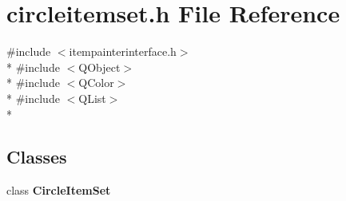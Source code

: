 \section{circleitemset.\+h File Reference}
\label{bk3_2curve_2painters_2circleitemset_8h}
{\ttfamily \#include $<$itempainterinterface.\+h$>$}\\*
{\ttfamily \#include $<$Q\+Object$>$}\\*
{\ttfamily \#include $<$Q\+Color$>$}\\*
{\ttfamily \#include $<$Q\+List$>$}\\*
\subsection*{Classes}
\begin{DoxyCompactItemize}
\item 
class {\bf Circle\+Item\+Set}
\end{DoxyCompactItemize}
